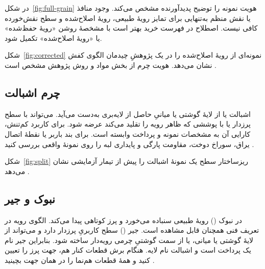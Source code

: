 در شکل~\ref{fig:full-grain} هویت نمونه را توضیح پدیدآورنده مشخص می‌کند. وجود منافذ یا نقش منظم به‌تنهایی برای تمایز رویۀ طبیعی، رویۀ اصلاح‌شده و سطح نقش‌خورده کافی نیست. اصطلاح  در فهرست خرید بهتر است با مشخصۀ روشن «رویۀ حفظ‌شده» یا «رویۀ اصلاح‌شده» تکمیل شود.

شکل~\ref{fig:corrected} نمونه‌ای از رویۀ اصلاح‌شده را در یک پژوهشِ چیدمان الگوی کفش نشان می‌دهد. هویت چرم از بخش مواد و روش پژوهش مشخص است \cite{corrected}.

\subsection{چرم اشبالت}

اشبالت یا  از لایۀ گوشتی یا میانیِ حاصل از لایه‌بری به‌دست می‌آید. می‌تواند با سطح پرزدار یا با پوششی که ظاهر رویه را تقلید می‌کند عرضه شود. برای کاربرد کم‌تنش، کارایی آن به مشخصات نمونه و پرداخت وابسته است. برای بند باربر یا نقطۀ اتصال یراق، سوراخ دوخت، مقاومت پارگی و پایداری لبه را روی نمونۀ واقعی بررسی کنید \cite{lwg,jrc}.

شکل~\ref{fig:split} ریزساختار سطح یک نمونۀ اشبالت را پیش از تیمار آزمایشی نشان می‌دهد \cite{split}.

\begin{figure}[!htbp]
  \centering
  \hfill
\end{figure}

\subsection{نبوک و جیر}

در نبوک () رویۀ طبیعی سنباده می‌خورد و پرز کوتاهی پیدا می‌کند. الگوی رویه در تعریف فنی همچنان قابل مشاهده است. جیر () سطح کاربریِ پرزدار دارد و می‌تواند از لایۀ گوشتی یا میانی، یا از سمت گوشتیِ چرمی رویه‌دار ساخته شود. بنابراین جیر نام یک پرداخت است و اشبالت نام لایه. هنگام برش قطعات کنار هم، جهت پرز را تعیین کنید و همۀ قطعات هم‌نما را در همان جهت بچینید \cite{lwg,jrc}.

\begin{figure}[!htbp]
  \centering
  \hfill
\end{figure}

